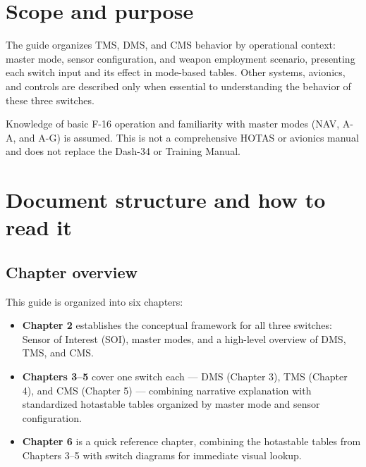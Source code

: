 \documentclass[11pt, a4paper, twoside]{report}
\begin{document}
\section{Scope and purpose}
\label{sec:C1-S2}

The guide organizes TMS, DMS, and CMS behavior by operational context: master mode, sensor configuration, and weapon employment scenario, presenting each switch input and its effect in mode-based tables. Other systems, avionics, and controls are described only when essential to understanding the behavior of these three switches.

Knowledge of basic F-16 operation and familiarity with master modes (NAV, A-A, and A-G) is assumed. This is not a comprehensive HOTAS or avionics manual and does not replace the Dash-34 or Training Manual.

\section{Document structure and how to read it}
\label{sec:C1-S3}

\subsection{Chapter overview}
\label{sec:C1-S3-S1}

This guide is organized into six chapters:

\begin{itemize}
	\item \textbf{Chapter 2} establishes the conceptual framework for all three switches: Sensor of Interest (SOI), master modes, and a high-level overview of DMS, TMS, and CMS.
	\item \textbf{Chapters 3--5} cover one switch each --- DMS (Chapter 3), TMS (Chapter 4), and CMS (Chapter 5) --- combining narrative explanation with standardized hotastable tables organized by master mode and sensor configuration.
	\item \textbf{Chapter 6} is a quick reference chapter, combining the hotastable tables from Chapters 3--5 with switch diagrams for immediate visual lookup.
\end{itemize}
\end{document}
